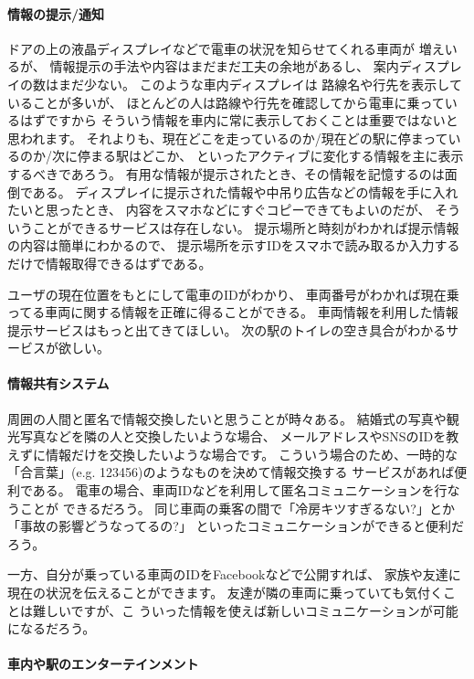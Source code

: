 \documentclass[twocolumn,10pt]{jarticle}
\begin{document}
\paragraph{情報の提示/通知}

ドアの上の液晶ディスプレイなどで電車の状況を知らせてくれる車両が
増えいるが、 情報提示の手法や内容はまだまだ工夫の余地があるし、
案内ディスプレイの数はまだ少ない。
このような車内ディスプレイは
路線名や行先を表示していることが多いが、
ほとんどの人は路線や行先を確認してから電車に乗っているはずですから
そういう情報を車内に常に表示しておくことは重要ではないと思われます。
それよりも、現在どこを走っているのか/現在どの駅に停まっているのか/次に停まる駅はどこか、
といったアクティブに変化する情報を主に表示するべきであろう。
有用な情報が提示されたとき、その情報を記憶するのは面倒である。
ディスプレイに提示された情報や中吊り広告などの情報を手に入れたいと思ったとき、
内容をスマホなどにすぐコピーできてもよいのだが、
そういうことができるサービスは存在しない。
提示場所と時刻がわかれば提示情報の内容は簡単にわかるので、
提示場所を示すIDをスマホで読み取るか入力するだけで情報取得できるはずである。

ユーザの現在位置をもとにして電車のIDがわかり、
車両番号がわかれば現在乗ってる車両に関する情報を正確に得ることができる。
車両情報を利用した情報提示サービスはもっと出てきてほしい。
次の駅のトイレの空き具合がわかるサービスが欲しい。

\paragraph{情報共有システム}
  
周囲の人間と匿名で情報交換したいと思うことが時々ある。
結婚式の写真や観光写真などを隣の人と交換したいような場合、
メールアドレスやSNSのIDを教えずに情報だけを交換したいような場合です。
こういう場合のため、一時的な「合言葉」(e.g. 123456)のようなものを決めて情報交換する
サービスがあれば便利である。
電車の場合、車両IDなどを利用して匿名コミュニケーションを行なうことが
できるだろう。
同じ車両の乗客の間で「冷房キツすぎるない?」とか「事故の影響どうなってるの?」
といったコミュニケーションができると便利だろう。

一方、自分が乗っている車両のIDをFacebookなどで公開すれば、
家族や友達に現在の状況を伝えることができます。
友達が隣の車両に乗っていても気付くことは難しいですが、こ
ういった情報を使えば新しいコミュニケーションが可能になるだろう。

\paragraph{車内や駅のエンターテインメント}
  
\end{document}
